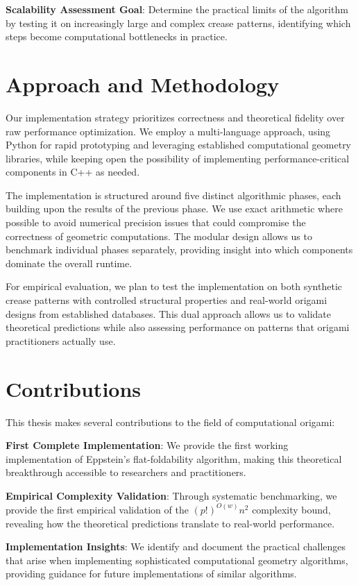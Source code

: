 \textbf{Scalability Assessment Goal}: Determine the practical limits of the algorithm by testing it on increasingly large and complex crease patterns, identifying which steps become computational bottlenecks in practice.

\section{Approach and Methodology}

Our implementation strategy prioritizes correctness and theoretical fidelity over raw performance optimization. We employ a multi-language approach, using Python for rapid prototyping and leveraging established computational geometry libraries, while keeping open the possibility of implementing performance-critical components in C++ as needed.

The implementation is structured around five distinct algorithmic phases, each building upon the results of the previous phase. We use exact arithmetic where possible to avoid numerical precision issues that could compromise the correctness of geometric computations. The modular design allows us to benchmark individual phases separately, providing insight into which components dominate the overall runtime.

For empirical evaluation, we plan to test the implementation on both synthetic crease patterns with controlled structural properties and real-world origami designs from established databases. This dual approach allows us to validate theoretical predictions while also assessing performance on patterns that origami practitioners actually use.

\section{Contributions}

This thesis makes several contributions to the field of computational origami:

\textbf{First Complete Implementation}: We provide the first working implementation of Eppstein's flat-foldability algorithm, making this theoretical breakthrough accessible to researchers and practitioners.

\textbf{Empirical Complexity Validation}: Through systematic benchmarking, we provide the first empirical validation of the $(p!)^{O(w)}n^2$ complexity bound, revealing how the theoretical predictions translate to real-world performance.

\textbf{Implementation Insights}: We identify and document the practical challenges that arise when implementing sophisticated computational geometry algorithms, providing guidance for future implementations of similar algorithms.

